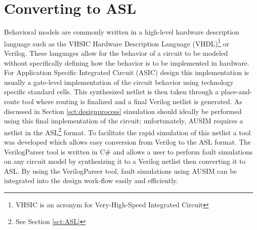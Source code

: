 \documentclass[12pt]{report}
\begin{document}
\section{Converting to ASL}
Behavioral models are commonly written in a high-level hardware description language such as the VHSIC Hardware Description Language (VHDL)\footnote{VHSIC is an acronym for Very-High-Speed Integrated Circuit} or Verilog.  These languages allow for the behavior of a circuit to be modeled without specifically defining how the behavior is to be implemented in hardware.  For Application Specific Integrated Circuit (ASIC) design this implementation is usually a gate-level implementation of the circuit behavior using technology specific standard cells.  This synthesized netlist is then taken through a place-and-route tool where routing is finalized and a final Verilog netlist is generated\cite{advancedverilog}.  As discussed in Section \ref{sct:designprocess} simulation should ideally be performed using this final implementation of the circuit; unfortunately, AUSIM requires a netlist in the ASL\footnote{See Section \ref{sct:ASL}} format.   To facilitate the rapid simulation of this netlist a tool was developed which allows easy conversion from Verilog to the ASL format.  The VerilogParser tool is written in C\#\cite{csharp} and allows a user to perform fault simulations on any circuit model by synthesizing it to a Verilog netlist then converting it to ASL.  By using the VerilogParser tool, fault simulations using AUSIM can be integrated into the design work-flow easily and efficiently.
\end{document}
